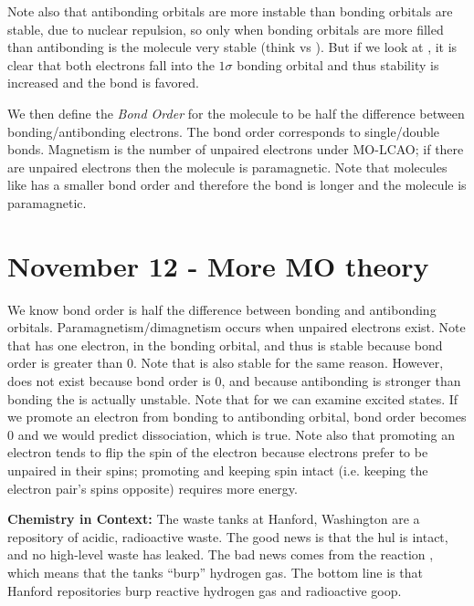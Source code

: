 \documentclass{report}
\begin{document}
Note also that antibonding orbitals are more instable than bonding orbitals are stable, due to nuclear repulsion, so only when bonding orbitals are more filled than antibonding is the molecule very stable (think  vs ). But if we look at , it is clear that both electrons fall into the $1\sigma$ bonding orbital and thus stability is increased and the bond is favored.

We then define the \emph{Bond Order} for the molecule to be half the difference between bonding/antibonding electrons. The bond order corresponds to single/double bonds. Magnetism is the number of unpaired electrons under MO-LCAO; if there are unpaired electrons then the molecule is paramagnetic. Note that molecules like  has a smaller bond order and therefore the bond is longer and the molecule is paramagnetic. 

\chapter{November 12 - More MO theory}

We know bond order is half the difference between bonding and antibonding orbitals. Paramagnetism/dimagnetism occurs when unpaired electrons exist. Note that  has one electron, in the bonding orbital, and thus is stable because bond order is greater than $0$. Note that  is also stable for the same reason. However,  does not exist because bond order is $0$, and because antibonding is stronger than bonding the  is actually unstable. Note that for  we can examine excited states. If we promote an electron from bonding to antibonding orbital, bond order becomes $0$ and we would predict dissociation, which is true. Note also that promoting an electron tends to flip the spin of the electron because electrons prefer to be unpaired in their spins; promoting and keeping spin intact (i.e. keeping the electron pair's spins opposite) requires more energy.

\begin{center}\textbf{Chemistry in Context: } The waste tanks at Hanford, Washington are a repository of acidic, radioactive waste. The good news is that the hul is intact, and no high-level waste has leaked. The bad news comes from the reaction , which means that the tanks ``burp'' hydrogen gas. The bottom line is that Hanford repositories burp reactive hydrogen gas and radioactive goop.\end{center}
\end{document}
